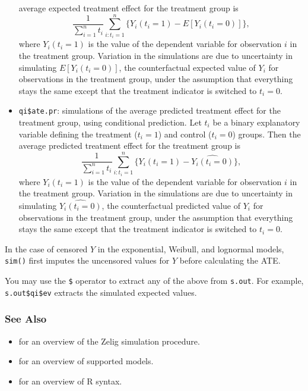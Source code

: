\begin{itemize}
    average expected treatment effect for the treatment group is
    \begin{equation*} \frac{1}{\sum_{i=1}^n t_i}\sum_{i:t_i=1}^n \{  Y_i(t_i=1) -
      E[Y_i(t_i=0)] \},
    \end{equation*} 
    where $Y_i(t_i=1)$ is the value of the dependent variable for
    observation $i$ in the treatment group.  Variation in the
    simulations are due to uncertainty in simulating $E[Y_i(t_i=0)]$,
    the counterfactual expected value of $Y_i$ for observations in the
    treatment group, under the assumption that everything stays the
    same except that the treatment indicator is switched to $t_i=0$.
  \item {\tt qi\$ate.pr}: simulations of the average predicted
    treatment effect for the treatment group, using conditional
    prediction. Let $t_i$ be a binary explanatory variable defining
    the treatment ($t_i=1$) and control ($t_i=0$) groups.  Then the
    average predicted treatment effect for the treatment group is
    \begin{equation*} \frac{1}{\sum_{i=1}^n t_i}\sum_{i:t_i=1}^n \{ Y_i(t_i=1) -
      \widehat{Y_i(t_i=0)} \},
    \end{equation*} 
    where $Y_i(t_i=1)$ is the value of the dependent variable for
    observation $i$ in the treatment group.  Variation in the
    simulations are due to uncertainty in simulating
    $\widehat{Y_i(t_i=0)}$, the counterfactual predicted value of
    $Y_i$ for observations in the treatment group, under the
    assumption that everything stays the same except that the
    treatment indicator is switched to $t_i=0$.
\end{itemize}

In the case of censored $Y$ in the exponential, Weibull, and lognormal
models, {\tt sim()} first imputes the uncensored values for $Y$ before
calculating the ATE.  

You may use the {\tt \$} operator to extract any of the
above from {\tt s.out}.  For example, {\tt s.out\$qi\$ev} extracts the
simulated expected values.

\subsubsection{See Also}
\begin{itemize}
  \item {} for an overview of the Zelig simulation procedure.
  \item {} for an overview of supported models.  
  \item {} for an overview of R syntax.  
\end{itemize}

